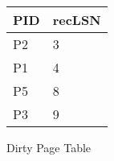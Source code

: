   \centering
  \begin{tabular}{|l|l|}
    \hline
    PID & recLSN \\
    \hline
    P2  & 3 \\
    P1  & 4 \\
    P5  & 8 \\
    P3  & 9 \\
    \hline
  \end{tabular}
  \caption{Dirty Page Table}
  \label{tab:dpt}
